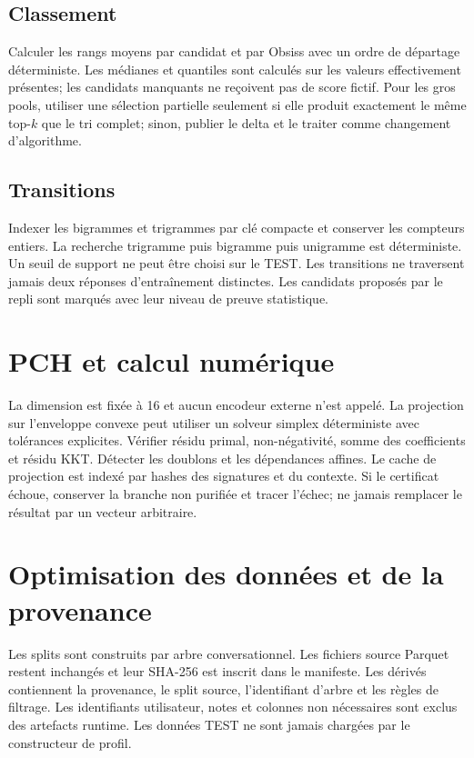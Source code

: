 \documentclass[11pt,a4paper]{report}
\begin{document}
\section{Classement}
Calculer les rangs moyens par candidat et par Obsiss avec un ordre de départage déterministe. Les médianes et quantiles sont calculés sur les valeurs effectivement présentes; les candidats manquants ne reçoivent pas de score fictif. Pour les gros pools, utiliser une sélection partielle seulement si elle produit exactement le même top-$k$ que le tri complet; sinon, publier le delta et le traiter comme changement d'algorithme.

\section{Transitions}
Indexer les bigrammes et trigrammes par clé compacte et conserver les compteurs entiers. La recherche trigramme puis bigramme puis unigramme est déterministe. Un seuil de support ne peut être choisi sur le TEST. Les transitions ne traversent jamais deux réponses d'entraînement distinctes. Les candidats proposés par le repli sont marqués avec leur niveau de preuve statistique.

\chapter{PCH et calcul numérique}
La dimension est fixée à 16 et aucun encodeur externe n'est appelé. La projection sur l'enveloppe convexe peut utiliser un solveur simplex déterministe avec tolérances explicites. Vérifier résidu primal, non-négativité, somme des coefficients et résidu KKT. Détecter les doublons et les dépendances affines. Le cache de projection est indexé par hashes des signatures et du contexte. Si le certificat échoue, conserver la branche non purifiée et tracer l'échec; ne jamais remplacer le résultat par un vecteur arbitraire.

\chapter{Optimisation des données et de la provenance}
Les splits sont construits par arbre conversationnel. Les fichiers source Parquet restent inchangés et leur SHA-256 est inscrit dans le manifeste. Les dérivés contiennent la provenance, le split source, l'identifiant d'arbre et les règles de filtrage. Les identifiants utilisateur, notes et colonnes non nécessaires sont exclus des artefacts runtime. Les données TEST ne sont jamais chargées par le constructeur de profil.
\end{document}
